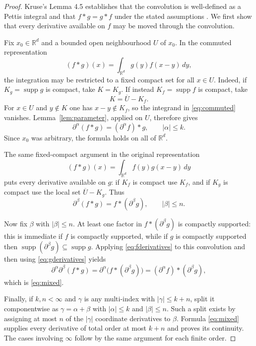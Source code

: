 \documentclass[11pt]{article}
\newcommand{\R}{\mathbb{R}}
\newcommand{\supp}{\operatorname{supp}}
\begin{document}
\begin{proof}
Kruse's Lemma 4.5 establishes that the convolution is well-defined as a
Pettis integral and that $f*g=g*f$ under the stated assumptions
\cite[pp.~14--16]{Kruse2019}. We first show that every derivative available
on $f$ may be moved through the convolution.

Fix $x_0\in\R^d$ and a bounded open neighbourhood $U$ of $x_0$. In the
commuted representation
\begin{equation}\label{eq:commuted}
 (f*g)(x)=\int_{\R^d}g(y)f(x-y)\,dy,
\end{equation}
the integration may be restricted to a fixed compact set for all $x\in U$.
Indeed, if $K_g=\supp g$ is compact, take $K=K_g$. If instead
$K_f=\supp f$ is compact, take
\[
 K=\overline U-K_f.
\]
For $x\in U$ and $y\notin K$ one has $x-y\notin K_f$, so the integrand in
\eqref{eq:commuted} vanishes. Lemma~\ref{lem:parameter}, applied on $U$,
therefore gives
\begin{equation}\label{eq:fderivatives}
 \partial^\alpha(f*g)=(\partial^\alpha f)*g,
 \qquad |\alpha|\le k.
\end{equation}
Since $x_0$ was arbitrary, the formula holds on all of $\R^d$.

The same fixed-compact argument in the original representation
\[
 (f*g)(x)=\int_{\R^d}f(y)g(x-y)\,dy
\]
puts every derivative available on $g$: if $K_f$ is compact use $K_f$, and
if $K_g$ is compact use the local set $\overline U-K_g$. Thus
\begin{equation}\label{eq:gderivatives}
 \partial^\beta(f*g)=f*(\partial^\beta g),
 \qquad |\beta|\le n.
\end{equation}

Now fix $\beta$ with $|\beta|\le n$. At least one factor in
$f*(\partial^\beta g)$ is compactly supported: this is immediate if $f$ is
compactly supported, while if $g$ is compactly supported then
$\supp(\partial^\beta g)\subseteq\supp g$. Applying
\eqref{eq:fderivatives} to this convolution and then using
\eqref{eq:gderivatives} yields
\[
 \partial^\alpha\partial^\beta(f*g)
 =\partial^\alpha\bigl(f*(\partial^\beta g)\bigr)
 =(\partial^\alpha f)*(\partial^\beta g),
\]
which is \eqref{eq:mixed}.

Finally, if $k,n<\infty$ and $\gamma$ is any multi-index with
$|\gamma|\le k+n$, split it componentwise as
$\gamma=\alpha+\beta$ with $|\alpha|\le k$ and $|\beta|\le n$. Such a split
exists by assigning at most $n$ of the $|\gamma|$ coordinate derivatives to
$\beta$. Formula \eqref{eq:mixed} supplies every derivative of total order at
most $k+n$ and proves its continuity. The cases involving $\infty$ follow by
the same argument for each finite order.
\end{proof}
\end{document}
